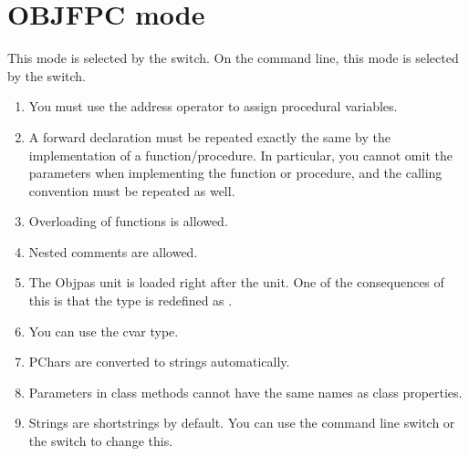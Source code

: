 \section{OBJFPC mode}
This mode is selected by the  switch. On the command line,
this mode is selected by the  switch.
\begin{enumerate}
\item You must use the address operator to assign procedural variables.
\item A forward declaration must be repeated exactly the same by the
implementation of a function/procedure. In particular, you cannot omit the
parameters when implementing the function or procedure, and the calling
convention must be repeated as well.
\item Overloading of functions is allowed.
\item Nested comments are allowed.
\item The Objpas unit is loaded right after the  unit. One of the
consequences of this is that the type  is redefined as
.
\item You can use the cvar type.
\item PChars are converted to strings automatically.
\item Parameters in class methods cannot have the same names as class
properties.
\item Strings are shortstrings by default. You can use the 
command line switch or the  switch to change this.
\end{enumerate}

